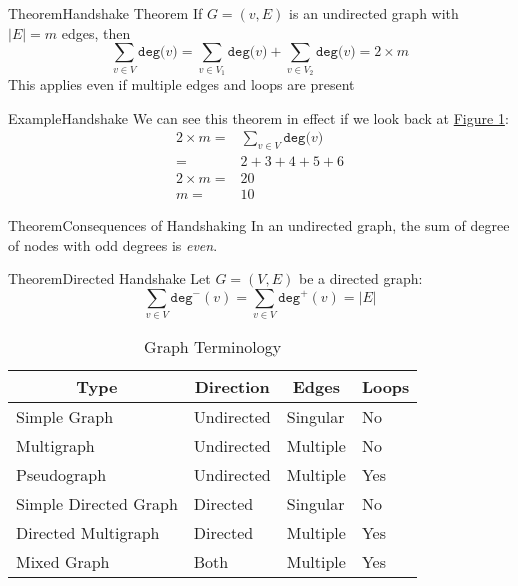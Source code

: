 \documentclass{MathNotes}
\newenvironment{example}[1]{\begin{BlueBox}{Example}{#1}}{\end{BlueBox}}
\newenvironment{theorem}[1]{\begin{GrayBox}{Theorem}{#1}}{\end{GrayBox}}
\begin{document}
\begin{theorem}{Handshake Theorem}
	If $G=(v,E)$ is an undirected graph with $|E|=m$ edges, then
	\[\sum_{v\in V}\texttt{deg($v$)}=\sum_{v\in V_1}\texttt{deg($v$)}+\sum_{v\in V_2}\texttt{deg($v$)}=2\times m\]
	This applies even if multiple edges and loops are present
\end{theorem}

\begin{example}{Handshake}
	We can see this theorem in effect if we look back at
	\hyperref[fig:neighborhoods]{Figure 1}:
	\begin{align*}
		2\times m = & \sum_{v\in V}\texttt{deg($v$)} \\
		=           & 2 + 3 + 4 + 5 + 6              \\
		2\times m = & 20                             \\
		m =         & 10
	\end{align*}
\end{example}

\newpage
\begin{multicols}{2}
	\begin{theorem}{Consequences of Handshaking}
		In an undirected graph, the  sum of degree of nodes with odd degrees is
		\textit{even}.
	\end{theorem}
	\begin{theorem}{Directed Handshake}
		Let $G=(V,E)$ be a directed graph:
		\[\sum_{v\in V}\texttt{deg}^-(v)=\sum_{v\in V}\texttt{deg}^+(v)=|E|\]
	\end{theorem}
\end{multicols}

\begin{table}[h!]
	\centering
	\caption{Graph Terminology}
	\begin{tabular}{llll}
		\multicolumn{1}{c}{\textbf{Type}}      &
		\multicolumn{1}{c}{\textbf{Direction}} &
		\multicolumn{1}{c}{\textbf{Edges}}     &
		\multicolumn{1}{c}{\textbf{Loops}}                                   \\
		\midrule
		Simple Graph                           & Undirected & Singular & No  \\
		Multigraph                             & Undirected & Multiple & No  \\
		Pseudograph                            & Undirected & Multiple & Yes \\
		Simple Directed Graph                  & Directed   & Singular & No  \\
		Directed Multigraph                    & Directed   & Multiple & Yes \\
		Mixed Graph                            & Both       & Multiple & Yes \\
	\end{tabular}
\end{table}
\end{document}

